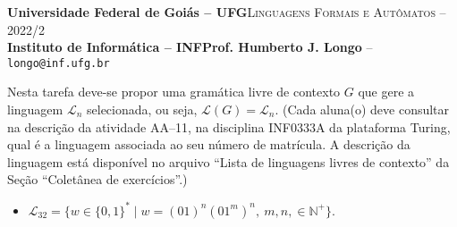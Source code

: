 \documentclass[12pt]{article}
\def\discente{Rafael Nunes Moreira Costa}
\def\matricula{202107855}
\def\ua{11}
\def\myling{{32}} %
\begin{document}
 \begin{tcolorbox}[rounded corners, colback=blue!3, colframe=blue!40!black]
  \footnotesize\textbf{Universidade Federal de Goiás -- UFG}\hfill \textsc{Linguagens Formais e Autômatos -- 2022/2}\\
  \footnotesize\textbf{Instituto de Informática -- INF\hfill Prof. Humberto J. Longo} -- \scriptsize\texttt{longo@inf.ufg.br}
 \end{tcolorbox}\bigskip
%
\begin{tcolorbox}[rounded corners, colback=blue!2, colframe=blue!40!black, title=\textbf{Atividade AA-\ua}]
  Nesta tarefa deve-se propor uma gramática livre de contexto $G$ que gere a linguagem $\mathcal{L}_n$ selecionada, ou seja, $\mathcal{L}(G)=\mathcal{L}_n$. (Cada aluna(o) deve consultar na descrição da atividade AA--\ua, na disciplina INF0333A da plataforma Turing, qual é a linguagem associada ao seu número de matrícula. A descrição da linguagem está disponível no arquivo ``Lista de linguagens livres de contexto'' da Seção ``Coletânea de exercícios''.)
\end{tcolorbox}\bigskip

%
\begin{tcolorbox}[rounded corners, colback=yellow!5, colframe=red!40!black, title={\discente\ (\matricula)}]
 \begin{itemize}[leftmargin=*]
  \item $\mathcal{L}_{\myling} = \{w\in\{0,1\}^*\mid w = (01)^n(01^m)^n,\ m,n,\in\mathbb{N}^+\}$.
 \end{itemize}
\end{tcolorbox}\bigskip
\end{document}
